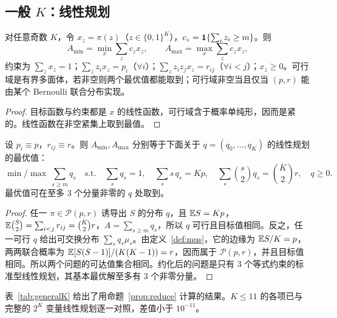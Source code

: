 \documentclass[11pt]{article}
\begin{document}
\subsection{一般 $K$：线性规划}

\begin{theorem}[线性规划表述]\label{thm:lp}
对任意奇数 $K$，令 $x_z=\pi(z)$（$z\in\{0,1\}^K$），$c_z=\mathbf{1}\{\sum_iz_i\ge m\}$。则
\[
A_{\min}=\min_x\sum_zc_zx_z,\qquad A_{\max}=\max_x\sum_zc_zx_z,
\]
约束为 $\sum_zx_z=1$；$\sum_zz_ix_z=p_i$（$\forall i$）；$\sum_zz_iz_jx_z=r_{ij}$（$\forall i<j$）；$x_z\ge0$。可行域是有界多面体，若非空则两个最优值都能取到；可行域非空当且仅当 $(p,r)$ 能由某个 Bernoulli 联合分布实现。
\end{theorem}
\begin{proof}
目标函数与约束都是 $x$ 的线性函数，可行域含于概率单纯形，因而是紧的。线性函数在非空紧集上取到最值。
\end{proof}

\begin{proposition}[对称情形的约化]\label{prop:reduce}
设 $p_i\equiv p$，$r_{ij}\equiv r$。则 $A_{\min},A_{\max}$ 分别等于下面关于 $q=(q_0,\dots,q_K)$ 的线性规划的最优值：
\[
\min / \max\ \sum_{s\ge m}q_s\quad\text{s.t.}\quad \sum_sq_s=1,\quad \sum_s s\,q_s=Kp,\quad \sum_s\binom s2q_s=\binom K2r,\quad q\ge0 .
\]
最优值可在至多 3 个分量非零的 $q$ 处取到。
\end{proposition}
\begin{proof}
任一 $\pi\in\mathcal P(p,r)$ 诱导出 $S$ 的分布 $q$，且 $\mathbb{E} S=Kp$，$\mathbb{E}\binom S2=\sum_{i<j}r_{ij}=\binom K2r$，$A=\sum_{s\ge m}q_s$，所以 $q$ 可行且目标值相同。反之，任一可行 $q$ 给出可交换分布 $\sum_sq_s\mu_s$。由定义~\ref{def:mus}，它的边缘为 $\mathbb{E} S/K=p$，两两联合概率为 $\mathbb{E}[S(S-1)]/(K(K-1))=r$，因而属于 $\mathcal P(p,r)$，并且目标值相同。所以两个问题的可达值集合相同。约化后的问题是只有 3 个等式约束的标准型线性规划，其基本最优解至多有 3 个非零分量。
\end{proof}

表~\ref{tab:generalK} 给出了用命题~\ref{prop:reduce} 计算的结果。$K\le11$ 的各项已与完整的 $2^K$ 变量线性规划逐一对照，差值小于 $10^{-11}$。
\end{document}
